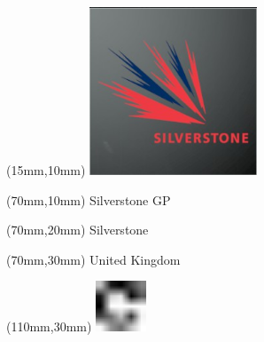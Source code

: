 \null\newpage
\begin{textblock*}{50mm}(15mm,10mm)%
\includegraphics[width=50mm]{LG/2015-05-20_00094.png}
\end{textblock*}
\begin{textblock*}{130mm}(70mm,10mm)%
{\fontsize{20}{20}\selectfont Silverstone GP}\\
\end{textblock*}
\begin{textblock*}{120mm}(70mm,20mm)%
{\fontsize{16}{16}\selectfont Silverstone}\\
\end{textblock*}
\begin{textblock*}{120mm}(70mm,30mm)%
{\fontsize{12}{12}\selectfont United Kingdom}
\end{textblock*}
\begin{textblock*}{30mm}(110mm,30mm)%
\centering
\includegraphics[height=15mm]{icons/fa-rotate-right.pdf}
\end{textblock*}

